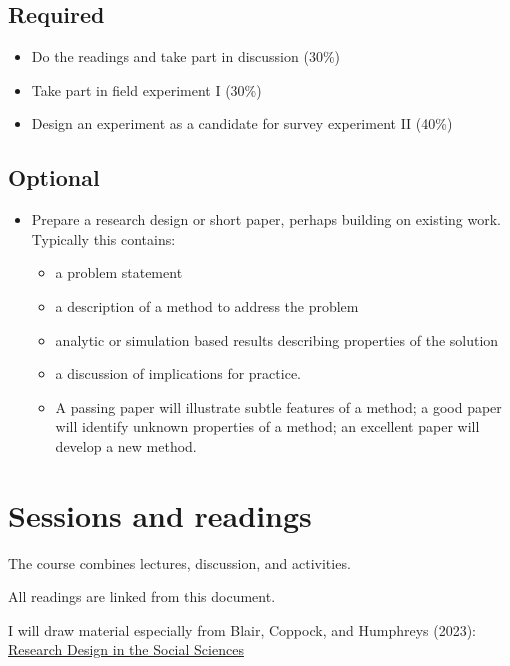 \documentclass[
  10pt,
  a4paper,10pt]{extarticle}
\providecommand{\tightlist}{%
  \setlength{\itemsep}{0pt}\setlength{\parskip}{0pt}}
\begin{document}
\subsection{Required}\label{required}

\begin{itemize}
\tightlist
\item
  Do the readings and take part in discussion (30\%)
\item
  Take part in field experiment I (30\%)
\item
  Design an experiment as a candidate for survey experiment II (40\%)
\end{itemize}

\subsection{Optional}\label{optional}

\begin{itemize}
\tightlist
\item
  Prepare a research design or short paper, perhaps building on existing
  work. Typically this contains:

  \begin{itemize}
  \tightlist
  \item
    a problem statement
  \item
    a description of a method to address the problem
  \item
    analytic or simulation based results describing properties of the
    solution
  \item
    a discussion of implications for practice.
  \item
    A passing paper will illustrate subtle features of a method; a good
    paper will identify unknown properties of a method; an excellent
    paper will develop a new method.
  \end{itemize}
\end{itemize}

\section{Sessions and readings}\label{sessions-and-readings}

The course combines lectures, discussion, and activities.

All readings are linked from this document.

I will draw material especially from Blair, Coppock, and Humphreys
(2023): \href{https://book.declaredesign.org/}{Research Design in the
Social Sciences}
\end{document}
